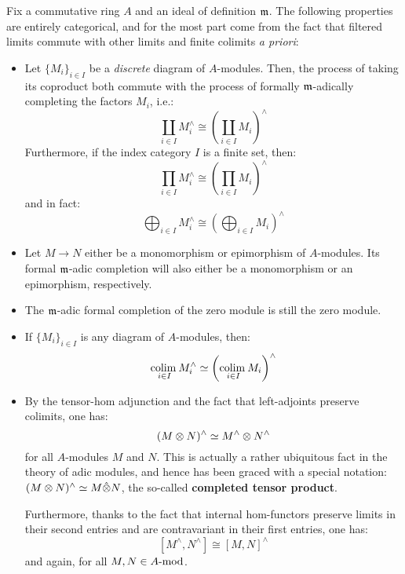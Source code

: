             \begin{remark} \label{remark: basic_properties_of_formal_completions}
                Fix a commutative ring $A$ and an ideal of definition $\m$. The following properties are entirely categorical, and for the most part come from the fact that filtered limits commute with other limits and finite colimits \textit{a priori}:
                    \begin{itemize}
                        \item Let $\{M_i\}_{i \in I}$ be a \textit{discrete} diagram of $A$-modules. Then, the process of taking its coproduct both commute with the process of formally $\m$-adically completing the factors $M_i$, i.e.:
                            $$\coprod_{i \in I} M_i^{\wedge} \cong \left(\coprod_{i \in I} M_i\right)^{\wedge}$$
                        Furthermore, if the index category $I$ is a finite set, then:
                            $$\prod_{i \in I} M_i^{\wedge} \cong \left(\prod_{i \in I} M_i\right)^{\wedge}$$
                        and in fact:
                            $$\bigoplus_{i \in I} M_i^{\wedge} \cong \left(\bigoplus_{i \in I} M_i\right)^{\wedge}$$  
                        \item Let $M \to N$ either be a monomorphism or epimorphism of $A$-modules. Its formal $\m$-adic completion will also either be a monomorphism or an epimorphism, respectively.
                        \item The $\m$-adic formal completion of the zero module is still the zero module.
                        \item If $\{M_i\}_{i \in I}$ is any diagram of $A$-modules, then:
                            $$\underset{i \in I}{\colim} M_i^{\wedge} \cong \left(\underset{i \in I}{\colim} M_i\right)^{\wedge}$$
                        \item By the tensor-hom adjunction and the fact that left-adjoints preserve colimits, one has:
                            $$(M \tensor N)^{\wedge} \cong M^{\wedge} \tensor N^{\wedge}$$
                        for all $A$-modules $M$ and $N$. This is actually a rather ubiquitous fact in the theory of adic modules, and hence has been graced with a special notation: $(M \tensor N)^{\wedge} \cong M \hat{\tensor} N$, the so-called \textbf{completed tensor product}.
                        
                        Furthermore, thanks to the fact that internal hom-functors preserve limits in their second entries and are contravariant in their first entries, one has:
                            $$[M^{\wedge}, N^{\wedge}] \cong [M, N]^{\wedge}$$
                        and again, for all $M, N \in A\mod$.
                    \end{itemize}
            \end{remark}
            
